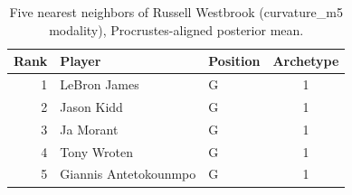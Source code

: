\begin{table}[htbp]
  \centering\small
  \begin{tabular}{rllc}
    \toprule
    Rank & Player & Position & Archetype \\
    \midrule
    1 & LeBron James & G & 1 \\
    2 & Jason Kidd & G & 1 \\
    3 & Ja Morant & G & 1 \\
    4 & Tony Wroten & G & 1 \\
    5 & Giannis Antetokounmpo & G & 1 \\
    \bottomrule
  \end{tabular}
  \caption{Five nearest neighbors of Russell Westbrook (curvature_m5 modality), Procrustes-aligned posterior mean.}
  \label{tab:Russell_Westbrook_neighbors_curvature_m5}
\end{table}

